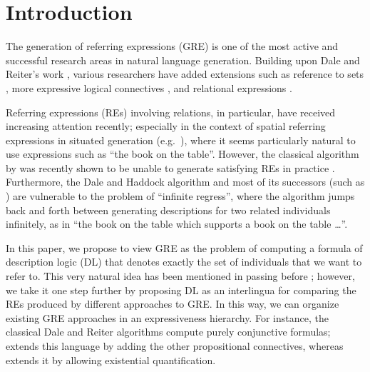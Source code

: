 \section{Introduction} \label{sec:introduction}

The generation of referring expressions (GRE) is one of the most
active and successful research areas in natural language generation.
Building upon Dale and Reiter's work \cite{dale89cooking,Dale1995},
various researchers have added extensions such as reference to sets
\cite{Stone2000}, more expressive logical connectives
\cite{deemter02:_gener_refer_expres}, and relational expressions
\cite{dale91:_gener_refer_expres_invol_relat}.

Referring expressions (REs) involving relations, in particular, have
received increasing attention recently; especially in the context of
spatial referring expressions in situated generation (e.g.\
\cite{kelleher06:_increm_gener_of_spatial_refer}), where it seems
particularly natural to use expressions such as ``the book on the
table''.  However, the classical algorithm by
 was recently shown to
be unable to generate satisfying REs in practice
\cite{viethen06:_algor_for_gener_refer_expres}.  Furthermore, the Dale
and Haddock algorithm and most of its successors (such as
\cite{kelleher06:_increm_gener_of_spatial_refer}) are vulnerable to
the problem of ``infinite regress'', where the algorithm jumps back
and forth between generating descriptions for two related individuals
infinitely, as in ``the book on the table which supports a book on the
table \ldots''.


In this paper, we propose to view GRE as the problem of computing a
formula of description logic (DL) that denotes exactly the set of
individuals that we want to refer to.  This very natural idea has been
mentioned in passing before
\cite{Krahmer2003,gardent07:_gener_bridg_defin_descr}; however, we
take it one step further by proposing DL as an interlingua for
comparing the REs produced by different approaches to GRE.  In this
way, we can organize existing GRE approaches in an expressiveness
hierarchy.  For instance, the classical Dale and Reiter algorithms
compute purely conjunctive formulas;
 extends this language by
adding the other propositional connectives, whereas
 extends it by
allowing existential quantification.

